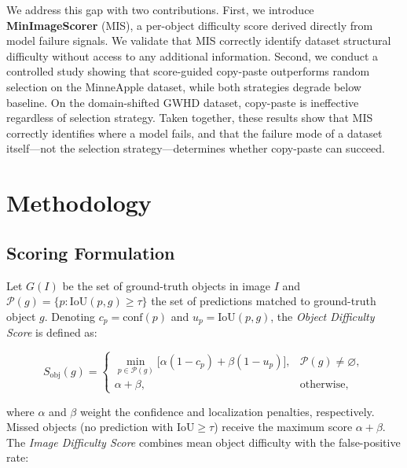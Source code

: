 \documentclass[conference]{IEEEtran}
\begin{document}
We address this gap with two contributions.
First, we introduce \textbf{MinImageScorer} (MIS), a per-object
difficulty score derived directly from model failure signals.
We validate that MIS correctly identify dataset structural difficulty
without access to any additional information.
Second, we conduct a controlled study showing that score-guided
copy-paste outperforms random selection on the 
MinneApple dataset, while both strategies degrade below baseline. 
On the domain-shifted GWHD dataset, copy-paste
is ineffective regardless of selection strategy.
Taken together, these results show that MIS correctly identifies
where a model fails, and that the failure mode of a dataset itself---not the
selection strategy---determines whether copy-paste can succeed.

\section{Methodology}

\subsection{Scoring Formulation}

Let $G(I)$ be the set of ground-truth objects in image $I$ and
$\mathcal{P}(g) = \{p : \mathrm{IoU}(p,g) \ge \tau\}$
the set of predictions matched to ground-truth object $g$.
Denoting $c_p = \mathrm{conf}(p)$ and $u_p = \mathrm{IoU}(p,g)$,
the \emph{Object Difficulty Score} is defined as:

\begin{equation}
S_{\mathrm{obj}}(g) =
\begin{cases}
  \min_{p \in \mathcal{P}(g)}
    \bigl[\alpha(1{-}c_p) + \beta(1{-}u_p)\bigr],
    & \mathcal{P}(g) \neq \varnothing, \\[3pt]
  \alpha + \beta, & \text{otherwise,}
\end{cases}
\label{eq:obj}
\end{equation}

where $\alpha$ and $\beta$ weight the confidence and localization
penalties, respectively.
Missed objects (no prediction with $\mathrm{IoU} \ge \tau$) receive
the maximum score $\alpha{+}\beta$.
The \emph{Image Difficulty Score} combines mean object difficulty with
the false-positive rate:
\end{document}
